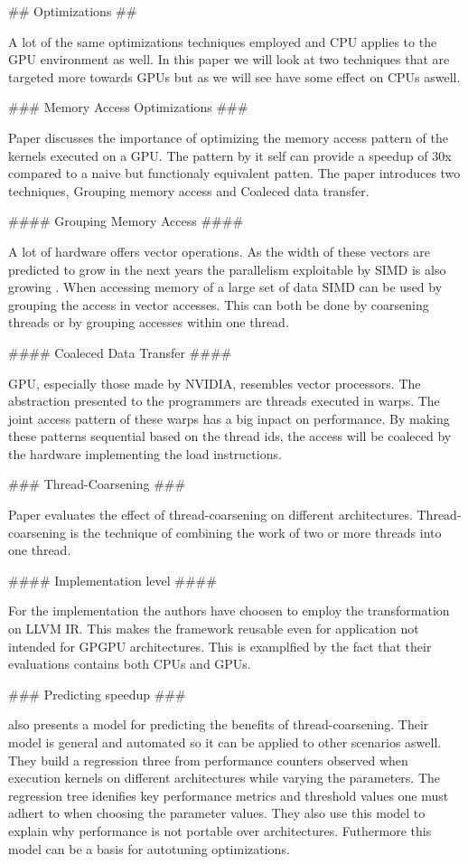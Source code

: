 \begin{markdown}

## Optimizations ##

A lot of the same optimizations techniques employed and CPU applies to
the GPU environment as well. In this paper we will look at two
techniques that are targeted more towards GPUs but as we will see have
some effect on CPUs aswell. 

### Memory Access Optimizations ###

Paper \cite{mem-acc} discusses the importance of optimizing the memory
access pattern of the kernels executed on a GPU. The pattern by it
self can provide a speedup of 30x compared to a naive but functionaly
equivalent patten. The paper introduces two techniques, Grouping
memory access and Coaleced data transfer.

#### Grouping Memory Access ####

A lot of hardware offers vector operations. As the width of these
vectors are predicted to grow in the next years the parallelism
exploitable by SIMD is also growing \cite{Hennessy}. When accessing
memory of a large set of data SIMD can be used by grouping the access
in vector accesses. This can both be done by coarsening threads or by
grouping accesses within one thread.

#### Coaleced Data Transfer ####

GPU, especially those made by NVIDIA, resembles vector processors. The
abstraction presented to the programmers are threads executed in
warps. The joint access pattern of these warps has a big inpact on
performance. By making these patterns sequential based on the thread
ids, the access will be coaleced by the hardware implementing the load
instructions.

### Thread-Coarsening ###

Paper \cite{thd-coa} evaluates the effect of thread-coarsening on
different architectures. Thread-coarsening is the technique of
combining the work of two or more threads into one thread.

#### Implementation level ####

For the implementation the authors have choosen to employ the
transformation on LLVM IR\cite{LLVM}. This makes the framework
reusable even for application not intended for GPGPU
architectures. This is examplfied by the fact that their evaluations
contains both CPUs and GPUs.

### Predicting speedup ###

\cite{thd-coa} also presents a model for predicting the benefits of
thread-coarsening. Their model is general and automated so it can be
applied to other scenarios aswell. They build a regression three from
performance counters observed when execution kernels on different
architectures while varying the parameters. The regression tree
idenifies key performance metrics and threshold values one must adhert
to when choosing the parameter values. They also use this model to
explain why performance is not portable over architectures. Futhermore
this model can be a basis for autotuning optimizations. 

\end{markdown}


